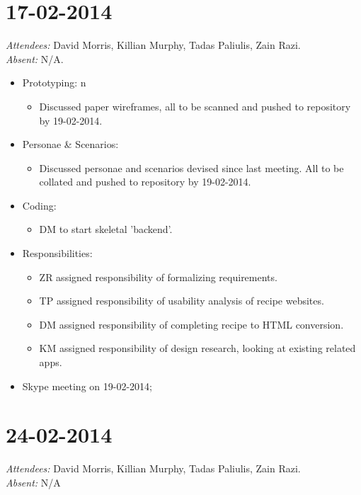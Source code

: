 \documentclass{article}
\begin{document}
\clearpage

\section*{17-02-2014}
\vspace{0.5cm}
\emph{Attendees: }David Morris, Killian Murphy, Tadas Paliulis, Zain Razi.
\\
\emph{Absent: }N/A.

\begin{itemize}
\item Prototyping:
  n  \begin{itemize}
  \item Discussed paper wireframes, all to be scanned and pushed to repository by 19-02-2014.
  \end{itemize}
\item Personae \& Scenarios:
  \begin{itemize}
  \item Discussed personae and scenarios devised since last meeting. All to be collated and pushed to repository by 19-02-2014.
  \end{itemize}
\item Coding:
  \begin{itemize}
  \item DM to start skeletal 'backend'.
  \end{itemize}
\item Responsibilities:
  \begin{itemize}
  \item ZR assigned responsibility of formalizing requirements.
  \item TP assigned responsibility of usability analysis of recipe websites.
  \item DM assigned responsibility of completing recipe to HTML conversion.
  \item KM assigned responsibility of design research, looking at existing related apps.
  \end{itemize}
\item Skype meeting on 19-02-2014;
\end{itemize}

\clearpage

\section*{24-02-2014}
\vspace{0.5cm}
\emph{Attendees: }David Morris, Killian Murphy, Tadas Paliulis, Zain Razi.
\\
\emph{Absent: }N/A
\end{document}
